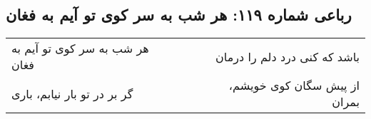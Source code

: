 \begin{center}
\section*{رباعی شماره ۱۱۹: هر شب به سر کوی تو آیم به فغان}
\label{sec:119}
\begin{longtable}{l p{0.5cm} r}
هر شب به سر کوی تو آیم به فغان
&&
باشد که کنی درد دلم را درمان
\\
گر بر در تو بار نیابم، باری
&&
از پیش سگان کوی خویشم، بمران
\\
\end{longtable}
\end{center}

